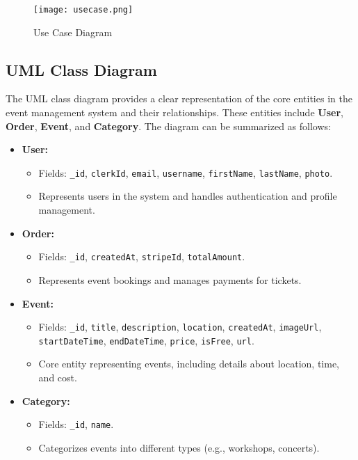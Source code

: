 \begin{figure}[H]
	\centering	\texttt{[image: usecase.png]}
    \caption{Use Case Diagram}
    \end{figure}


\subsection{UML Class Diagram}  
The UML class diagram provides a clear representation of the core entities in the event management system and their relationships. These entities include \textbf{User}, \textbf{Order}, \textbf{Event}, and \textbf{Category}. The diagram can be summarized as follows:  

\begin{itemize}
    \item \textbf{User:}  
    \begin{itemize}
        \item Fields: \texttt{\_id}, \texttt{clerkId}, \texttt{email}, \texttt{username}, \texttt{firstName}, \texttt{lastName}, \texttt{photo}.  
        \item Represents users in the system and handles authentication and profile management.  
    \end{itemize}
    
    \item \textbf{Order:}  
    \begin{itemize}
        \item Fields: \texttt{\_id}, \texttt{createdAt}, \texttt{stripeId}, \texttt{totalAmount}.  
        \item Represents event bookings and manages payments for tickets.  
    \end{itemize}
    
    \item \textbf{Event:}  
    \begin{itemize}
        \item Fields: \texttt{\_id}, \texttt{title}, \texttt{description}, \texttt{location}, \texttt{createdAt}, \texttt{imageUrl}, \texttt{startDateTime}, \texttt{endDateTime}, \texttt{price}, \texttt{isFree}, \texttt{url}.  
        \item Core entity representing events, including details about location, time, and cost.  
    \end{itemize}
    
    \item \textbf{Category:}  
    \begin{itemize}
        \item Fields: \texttt{\_id}, \texttt{name}.  
        \item Categorizes events into different types (e.g., workshops, concerts).  
    \end{itemize}
\end{itemize}

